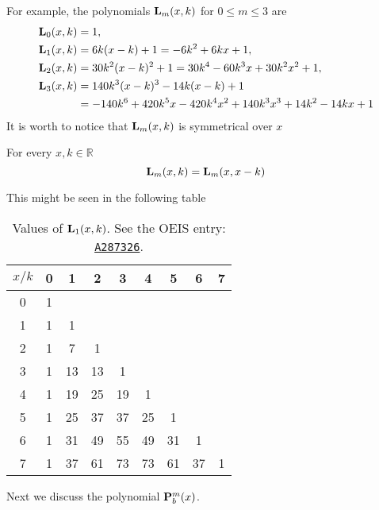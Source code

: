For example, the polynomials ${\mathbf{L}}\sb{m}(x,k)$ for $0\leq m\leq 3$ are
\begin{equation*}
    \begin{split}
        {\mathbf{L}}\sb{0}(x,k)
        &= 1, \\
        {\mathbf{L}}\sb{1}(x,k)
        &= 6 k (x-k) + 1
        = -6 k^2 + 6 k x + 1, \\
        {\mathbf{L}}\sb{2}(x,k)
        &=30 k^2 (x-k)^2+1
        =30 k^4-60 k^3 x+30 k^2 x^2+1, \\
        {\mathbf{L}}\sb{3}(x,k)
        &= 140 k^3 (x-k)^3-14 k (x-k)+1 \\
        &=-140 k^6+420 k^5 x-420 k^4 x^2+140 k^3 x^3+14 k^2-14 k x+1
    \end{split}
\end{equation*}
It is worth to notice that ${\mathbf{L}}\sb{m}(x,k)$ is symmetrical over $x$
\begin{ppty}
    \label{ppty_symmetry_of_polynomial_l}
    For every $x,k\in\mathbb{R}$
    \begin{equation*}
        {\mathbf{L}}\sb{m}(x,k) = {\mathbf{L}}\sb{m}(x,x-k)
    \end{equation*}
\end{ppty}
This might be seen in the following table
\begin{table}[H]
    \begin{tabular}{c|cccccccc}
        $x/k$ & 0 & 1  & 2  & 3  & 4  & 5  & 6  & 7 \\ [3px]
        \hline
        0     & 1 &    &    &    &    &    &    &   \\
        1     & 1 & 1  &    &    &    &    &    &   \\
        2     & 1 & 7  & 1  &    &    &    &    &   \\
        3     & 1 & 13 & 13 & 1  &    &    &    &   \\
        4     & 1 & 19 & 25 & 19 & 1  &    &    &   \\
        5     & 1 & 25 & 37 & 37 & 25 & 1  &    &   \\
        6     & 1 & 31 & 49 & 55 & 49 & 31 & 1  &   \\
        7     & 1 & 37 & 61 & 73 & 73 & 61 & 37 & 1 \\
    \end{tabular}
    \caption{Values of ${\mathbf{L}}\sb{1}(x,k)$. See the OEIS entry: \href{https://oeis.org/A287326}{\texttt{A287326}}.}
    \label{tab:fig_1}
\end{table}
Next we discuss the polynomial ${\mathbf{P}}\sp{m} \sb{b}(x)$.
